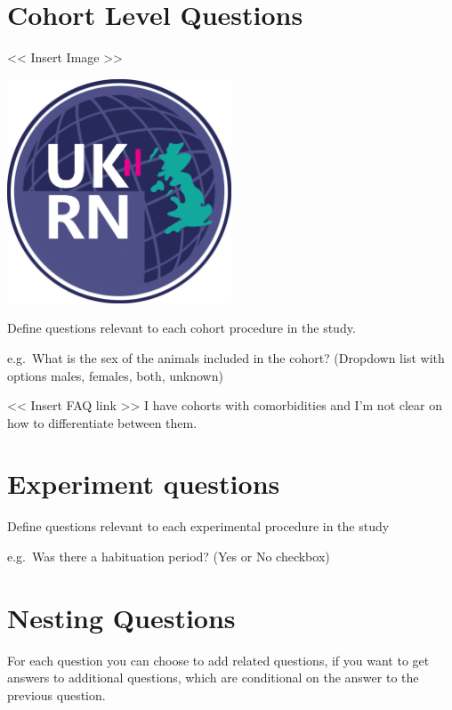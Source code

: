 \documentclass[
]{book}
\begin{document}
\hypertarget{cohort-level-questions}{%
\section{Cohort Level Questions}\label{cohort-level-questions}}

\textless{}\textless{} Insert Image \textgreater{}\textgreater{}

\includegraphics[width=0.5\textwidth,height=0.5\textheight]{figs/evidence-triangle.png}

Define questions relevant to each cohort procedure in the study.

e.g.~What is the sex of the animals included in the cohort?
(Dropdown list with options males, females, both, unknown)

\textless{}\textless{} Insert FAQ link \textgreater{}\textgreater{}
I have cohorts with comorbidities and I'm not clear on how to differentiate between them.

\hypertarget{experiment-questions}{%
\section{Experiment questions}\label{experiment-questions}}

Define questions relevant to each experimental procedure in the study

e.g.~Was there a habituation period?
(Yes or No checkbox)

\hypertarget{nesting-questions}{%
\section{Nesting Questions}\label{nesting-questions}}

For each question you can choose to add related questions, if you want to get answers to additional questions, which are conditional on the answer to the previous question.
\end{document}

